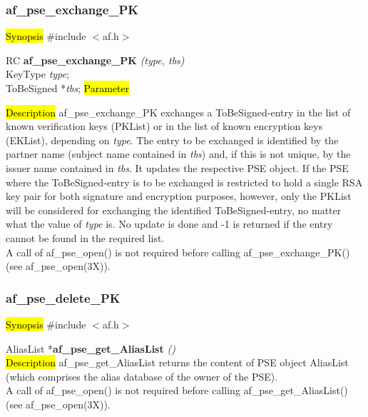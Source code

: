 \subsubsection{af\_pse\_exchange\_PK}
\label{af_change_PK}
\hl{Synopsis}
\#include $<$af.h$>$

RC {\bf af\_pse\_exchange\_PK} {\em (type, tbs)} \\
KeyType {\em type}; \\
ToBeSigned *{\em tbs};
\hl{Parameter}


\hl{Description}
af\_pse\_exchange\_PK exchanges a ToBeSigned-entry in the list of known 
verification keys (PKList) or in the list of known encryption keys (EKList), depending
on {\em type}. The entry to be exchanged is identified by the partner name (subject name
contained in {\em tbs}) and, if this is not unique, by the issuer name contained in {\em tbs}.
It updates the respective PSE object.
If the PSE where the ToBeSigned-entry is to be exchanged is restricted to hold a single RSA key pair
for both signature and encryption purposes, however, only the PKList will be considered for exchanging the identified ToBeSigned-entry,
no matter what the value of {\em type} is.
No update is done and -1 is returned if
the entry cannot be found in the required list.
\\ [1em]
A call of af\_pse\_open() is not required before calling af\_pse\_exchange\_PK()
(see af\_pse\_open(3X)).

\subsubsection{af\_pse\_delete\_PK}
\label{af_get_AliasList}
\hl{Synopsis}
\#include $<$af.h$>$

AliasList *{\bf af\_pse\_get\_AliasList} {\em ()} \\
\hl{Description}
af\_pse\_get\_AliasList returns the content of PSE object AliasList (which
comprises the alias database of the owner of the PSE).
\\ [1em]
A call of af\_pse\_open() is not required before calling af\_pse\_get\_AliasList()
(see af\_pse\_open(3X)).


